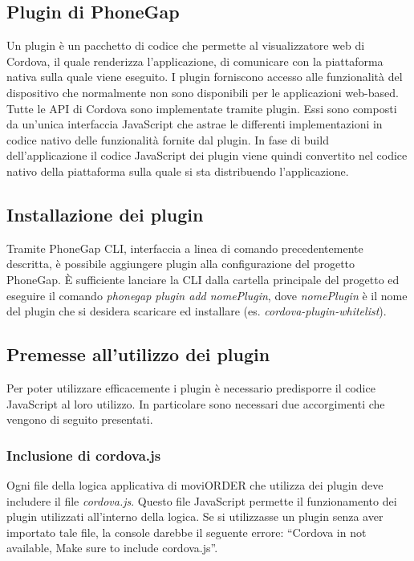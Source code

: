 \subsection{Plugin di PhoneGap}

Un plugin è un pacchetto di codice che permette al visualizzatore web di Cordova, il quale renderizza l'applicazione, di comunicare con la piattaforma nativa sulla quale viene eseguito. I plugin forniscono accesso alle funzionalità del dispositivo che normalmente non sono disponibili per le applicazioni web-based. Tutte le API di Cordova sono implementate tramite plugin. Essi sono composti da un'unica interfaccia JavaScript che astrae le differenti implementazioni in codice nativo delle funzionalità fornite dal plugin. In fase di build dell'applicazione il codice JavaScript dei plugin viene quindi convertito nel codice nativo della piattaforma sulla quale si sta distribuendo l'applicazione.

\subsection{Installazione dei plugin}

Tramite PhoneGap CLI, interfaccia a linea di comando precedentemente descritta, è possibile aggiungere plugin alla configurazione del progetto PhoneGap. È sufficiente lanciare la CLI dalla cartella principale del progetto ed eseguire il comando \textit{phonegap plugin add nomePlugin}, dove \textit{nomePlugin} è il nome del plugin che si desidera scaricare ed installare (es. \textit{cordova-plugin-whitelist}).

\subsection{Premesse all'utilizzo dei plugin}

Per poter utilizzare efficacemente i plugin è necessario predisporre il codice JavaScript al loro utilizzo. In particolare sono necessari due accorgimenti che vengono di seguito presentati.

\subsubsection{Inclusione di cordova.js}

Ogni file della logica applicativa di moviORDER che utilizza dei plugin deve includere il file \textit{cordova.js}. Questo file JavaScript permette il funzionamento dei plugin utilizzati all'interno della logica. Se si utilizzasse un plugin senza aver importato tale file, la console darebbe il seguente errore: ``Cordova in not available, Make sure to include cordova.js''.

